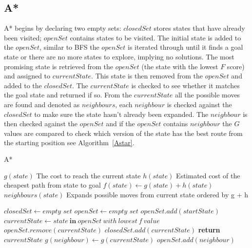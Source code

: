 \documentclass[final]{cmpreport}
\begin{document}
\subsection{A*}
A* begins by declaring two empty sets: $closedSet$ stores states that have already been visited; $openSet$ contains states to be visited. The initial state is added to the $openSet$, similar to BFS the $openSet$ is iterated through until it finds a goal state or there are no more states to explore, implying no solutions. The most promising state is retrieved from the $openSet$ (the state with the lowest $F$ score) and assigned to $currentState$. This state is then removed from the $openSet$ and added to the $closedSet$. The $currentState$ is checked to see whether it matches the goal state and returned if so. From the $currentState$ all the possible moves are found and denoted as $neighbours$, each $neighbour$ is checked against the $closedSet$ to make sure the state hasn't already been expanded. The $neighbour$ is then checked against the $openSet$ and if the $openSet$ contains $neighbour$ the $G$ values are compared to check which version of the state has the best route from the starting position see Algorithm~\ref{Astar}.

\begin{algorithm}
	\caption{A*}\label{Astar}
	\begin{algorithmic}[1]
		\State $g(state)$ \Comment The cost to reach the current state
		\State $h(state)$ \Comment Estimated cost of the cheapest path from state to goal
		\State $f(state) \gets g(state)+h(state)$
		\State $neighbours(state)$ \Comment Expands possible moves from current state ordered by g + h
		
		\State $closedSet \gets \textit{empty set}$
		\State $openSet \gets \textit{empty set}$
		\State $openSet.add(startState)$
		\State $currentState \gets state\   \textbf{in}\ openSet\ with\ lowest\ f\ value$
		\State $openSet.remove(currentState)$
		\State $closedSet.add(currentState)$
		\State \textbf{return} $currentState$
		\EndIf
		\State$g(neighbour) \gets g(currentState)$
		\EndIf	
		\Else
		\State $openSet.add(neighbour)$	
		\EndIf
		\EndIf
		
		\EndFor
		\EndWhile
		\EndProcedure
	\end{algorithmic}
\end{algorithm}
\end{document}
